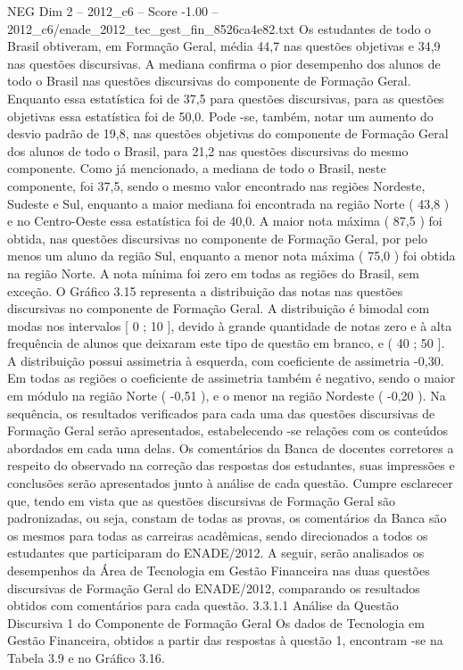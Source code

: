 \begin{textsample}{NEG Dim 2 – 2012\_c6 – Score -1.00 – 2012\_c6/enade\_2012\_tec\_gest\_fin\_8526ca4e82.txt}
Os estudantes de todo o Brasil obtiveram, em Formação Geral, média 44,7 nas questões objetivas e 34,9 nas questões discursivas.
A mediana confirma o pior desempenho dos alunos de todo o Brasil nas questões discursivas do componente de Formação Geral.
Enquanto essa estatística foi de 37,5 para questões discursivas, para as questões objetivas essa estatística foi de 50,0.
Pode -se, também, notar um aumento do desvio padrão de 19,8, nas questões objetivas do componente de Formação Geral dos alunos de todo o Brasil, para 21,2 nas questões discursivas do mesmo componente.
Como já mencionado, a mediana de todo o Brasil, neste componente, foi 37,5, sendo o mesmo valor encontrado nas regiões Nordeste, Sudeste e Sul, enquanto a maior mediana foi encontrada na região Norte ( 43,8 ) e no Centro-Oeste essa estatística foi de 40,0.
A maior nota máxima ( 87,5 ) foi obtida, nas questões discursivas no componente de Formação Geral, por pelo menos um aluno da região Sul, enquanto a menor nota máxima ( 75,0 ) foi obtida na região Norte.
A nota mínima foi zero em todas as regiões do Brasil, sem exceção.
O Gráfico 3.15 representa a distribuição das notas nas questões discursivas no componente de Formação Geral.
A distribuição é bimodal com modas nos intervalos [ 0 ; 10 ], devido à grande quantidade de notas zero e à alta frequência de alunos que deixaram este tipo de questão em branco, e ( 40 ; 50 ].
A distribuição possui assimetria à esquerda, com coeficiente de assimetria -0,30.
Em todas as regiões o coeficiente de assimetria também é negativo, sendo o maior em módulo na região Norte ( -0,51 ), e o menor na região Nordeste ( -0,20 ).
Na sequência, os resultados verificados para cada uma das questões discursivas de Formação Geral serão apresentados, estabelecendo -se relações com os conteúdos abordados em cada uma delas.
Os comentários da Banca de docentes corretores a respeito do observado na correção das respostas dos estudantes, suas impressões e conclusões serão apresentados junto à análise de cada questão.
Cumpre esclarecer que, tendo em vista que as questões discursivas de Formação Geral são padronizadas, ou seja, constam de todas as provas, os comentários da Banca são os mesmos para todas as carreiras acadêmicas, sendo direcionados a todos os estudantes que participaram do ENADE/2012.
A seguir, serão analisados os desempenhos da Área de Tecnologia em Gestão Financeira nas duas questões discursivas de Formação Geral do ENADE/2012, comparando os resultados obtidos com comentários para cada questão. 3.3.1.1 Análise da Questão Discursiva 1 do Componente de Formação Geral Os dados de Tecnologia em Gestão Financeira, obtidos a partir das respostas à questão 1, encontram -se na Tabela 3.9 e no Gráfico 3.16.

\end{textsample}
